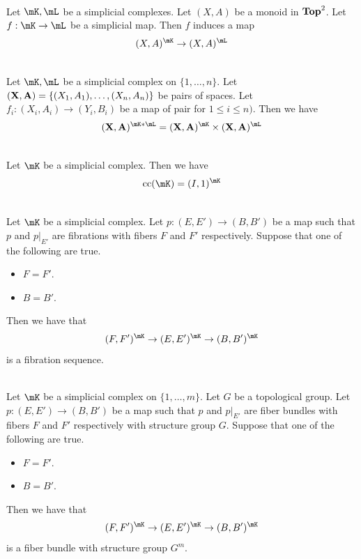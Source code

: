 \documentclass[a4paper]{article}
\begin{document}
\begin{prp}{}{}\\
Let $\mK,\mL$ be a simplicial complexes. Let $(X,A)$ be a monoid in $\bold{Top}^2$. Let $f:\mK\to\mL$ be a simplicial map. Then $f$ induces a map $$(X,A)^\mK\to(X,A)^\mL$$
\end{prp}

\begin{prp}{}{}\\
Let $\mK,\mL$ be a simplicial complex on $\{1,\dots,n\}$. Let $(\bold{X},\bold{A})=\{(X_1,A_1),\dots,(X_n,A_n)\}$ be pairs of spaces. Let $f_i:(X_i,A_i)\to(Y_i,B_i)$ be a map of pair for $1\leq i\leq n)$. Then we have $$(\bold{X},\bold{A})^{\mK\ast\mL}=(\bold{X},\bold{A})^\mK\times(\bold{X},\bold{A})^\mL$$
\end{prp}

\begin{eg}{}{}\\
Let $\mK$ be a simplicial complex. Then we have $$\text{cc}(\mK)=(I,1)^\mK$$
\end{eg}

\begin{prp}{}{}\\
Let $\mK$ be a simplicial complex. Let $p:(E,E')\to(B,B')$ be a map such that $p$ and $p|_{E'}$ are fibrations with fibers $F$ and $F'$ respectively. Suppose that one of the following are true. 
\begin{itemize}
\item $F=F'$. 
\item $B=B'$. 
\end{itemize}
Then we have that $$(F,F')^\mK\to(E,E')^\mK\to(B,B')^\mK$$ is a fibration sequence. 
\end{prp}

\begin{prp}{}{}\\
Let $\mK$ be a simplicial complex on $\{1,\dots,m\}$. Let $G$ be a topological group. Let $p:(E,E')\to(B,B')$ be a map such that $p$ and $p|_{E'}$ are fiber bundles with fibers $F$ and $F'$ respectively with structure group $G$. Suppose that one of the following are true. 
\begin{itemize}
\item $F=F'$. 
\item $B=B'$. 
\end{itemize}
Then we have that $$(F,F')^\mK\to(E,E')^\mK\to(B,B')^\mK$$ is a fiber bundle with structure group $G^m$. 
\end{prp}
\end{document}
